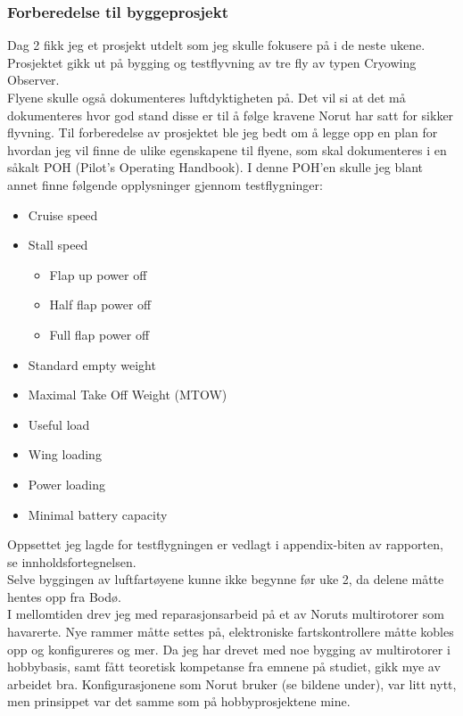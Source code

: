 \documentclass[12pt, a4paper]{article}
\begin{document}
\subsubsection{Forberedelse til byggeprosjekt}
Dag 2 fikk jeg et prosjekt utdelt som jeg skulle fokusere på i de neste ukene. Prosjektet gikk ut på bygging og testflyvning av tre fly av typen Cryowing Observer. \\
Flyene skulle også dokumenteres luftdyktigheten på. Det vil si at det må dokumenteres hvor god stand disse er til å følge kravene Norut har satt for sikker flyvning. Til forberedelse av prosjektet ble jeg bedt om å legge opp en plan for hvordan jeg vil finne de ulike egenskapene til flyene, som skal dokumenteres i en såkalt POH (Pilot's Operating Handbook). I denne POH'en skulle jeg blant annet finne følgende opplysninger gjennom testflygninger: 
\begin{itemize}
	\item Cruise speed
	\item Stall speed
	\begin{itemize}
		\item Flap up power off
		\item Half flap power off
		\item Full flap power off	
	\end{itemize}
	\item Standard empty weight
	\item Maximal Take Off Weight (MTOW)
	\item Useful load
	\item Wing loading
	\item Power loading
	\item Minimal battery capacity
\end{itemize}
Oppsettet jeg lagde for testflygningen er vedlagt i appendix-biten av rapporten, se innholdsfortegnelsen. \\
Selve byggingen av luftfartøyene kunne ikke begynne før uke 2, da delene måtte hentes opp fra Bodø. \\ 
\newpage
I mellomtiden drev jeg med reparasjonsarbeid på et av Noruts multirotorer som havarerte. Nye rammer måtte settes på, elektroniske fartskontrollere måtte kobles opp og konfigureres og mer. Da jeg har drevet med noe bygging av multirotorer i hobbybasis, samt fått teoretisk kompetanse fra emnene på studiet, gikk mye av arbeidet bra. Konfigurasjonene som Norut bruker (se bildene under), var litt nytt, men prinsippet var det samme som på hobbyprosjektene mine. \\
\end{document}
